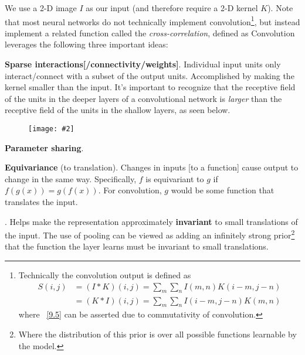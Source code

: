 \documentclass[11pt]{article}
\newcommand\myfig[2][0.3\textwidth]{\begin{figure}[h!]\centering\texttt{[image: \#2]}\end{figure}}
\newcommand\myspace[1][]{\vspace{#1\bigskipamount}}
\newcommand\p{\Needspace{10\baselineskip} \noindent}
\newcommand\tlab[1]{\tag{#1}\label{#1}}
\begin{document}
\p We use a 2-D image $I$ as our input (and therefore require a 2-D kernel $K$). Note that most neural networks do not technically implement convolution\footnote{Technically the convolution output is defined as
	\begin{align}
	S(i, j) &= (I * K)(i, j) = \sum_m \sum_n I(m, n)K(i -m, j -n) \tlab{9.4} \\
	&= (K * I)(i, j) =  \sum_m \sum_n I(i - m, j - n)K(m, n) \tlab{9.5} 
	\end{align}
	where ~\ref{9.5} can be asserted due to commutativity of convolution. }, but instead implement a related function called the \textit{cross-correlation}, defined as 
\graybox{
	S(i, j) = (I * K)(i, j) = \sum_m \sum_n I(i + m, j + n)K(m, n) \tlab{9.6}
}
Convolution leverages the following three important ideas:
\begin{compactitem}
	\item \textbf{Sparse interactions[/connectivity/weights]}. Individual input units only interact/connect with a subset of the output units. Accomplished by making the kernel smaller than the input. It's important to recognize that the receptive field of the units in the deeper layers of a convolutional network is \textit{larger} than the receptive field of the units in the shallow layers, as seen below.
	\myfig{SparseConv.PNG}
	
	\item \textbf{Parameter sharing}.
	
	\item \textbf{Equivariance} (to translation). Changes in inputs [to a function] cause output to change in the same way. Specifically, $f$ is equivariant to $g$ if $f(g(x)) = g(f(x))$. For convolution, $g$ would be some function that translates the input.
\end{compactitem}

\myspace
\p {}. Helps make the representation approximately \textbf{invariant} to small translations of the input. The use of pooling can be viewed as adding an infinitely strong prior\footnote{Where the distribution of this prior is over all possible functions learnable by the model.} that the function the layer learns must be invariant to small translations.
\end{document}
